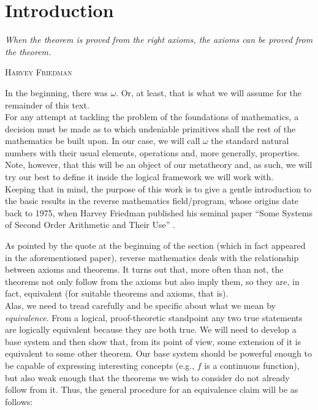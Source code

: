 \documentclass[../main.tex]{book}
\begin{document}
\chapter{Introduction}

\epigraph{
  \textit{When the theorem is proved from the right axioms, the axioms can be proved from the theorem.}
}{\textsc{Harvey Friedman}}

In the beginning, there was $\omega$. Or, at least, that is what we will assume for the remainder of this text. \\

For any attempt at tackling the problem of the foundations of mathematics, a decision must be made as to which undeniable primitives shall the rest of the mathematics be built upon. In our case, we will call $\omega$ the standard natural numbers with their usual elements, operations and, more generally, properties. Note, however, that this will be an object of our metatheory and, as such, we will try our best to define it inside the logical framework we will work with. \\

Keeping that in mind, the purpose of this work is to give a gentle introduction to the basic results in the reverse mathematics field/program, whose origins date back to 1975, when Harvey Friedman published his seminal paper ``Some Systems of Second Order Arithmetic and Their Use'' \cite{friedman}.

As pointed by the quote at the beginning of the section (which in fact appeared in the aforementioned paper), reverse mathematics deals with the relationship between axioms and theorems. It turns out that, more often than not, the theorems not only follow from the axioms but also imply them, so they are, in fact, equivalent (for suitable theorems and axioms, that is). \\

Alas, we need to tread carefully and be specific about what we mean by \textit{equivalence}. From a logical, proof-theoretic standpoint any two true statements are logically equivalent because they are both true. We will need to develop a base system and then show that, from its point of view, some extension of it is equivalent to some other theorem. Our base system should be powerful enough to be capable of expressing interesting concepts (e.g., $f$ is a continuous function), but also weak enough that the theorems we wish to consider do not already follow from it. Thus, the general procedure for an equivalence claim will be as follows: \\
\end{document}
